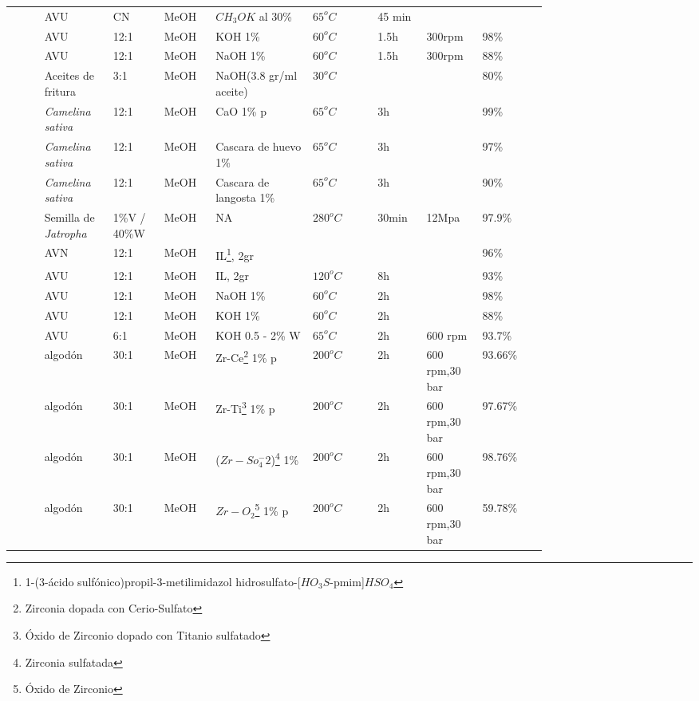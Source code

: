 \begin{longtable}{p{0.05\linewidth}  p{0.1\linewidth} p{0.07\linewidth}  p{0.07\linewidth} p{0.15\linewidth}  p{0.1\linewidth} p{0.07\linewidth}  p{0.07\linewidth} p{0.1\linewidth}}
	\cite{Caballero2012} &  AVU &  CN & MeOH&  $CH_3OK$ al 30\% &  $65^oC$ &45 min&   & \\
	\cite{CARO-BECERRAJuanLuisCASTELLANOS-RANGELLibierROMERO-GONZALEZFernandoRUIZ-MORALES2017} & AVU & 12:1 & MeOH & KOH 1\% &  $60^oC$ & 1.5h & 300rpm & 98\% \\
	\cite{CARO-BECERRAJuanLuisCASTELLANOS-RANGELLibierROMERO-GONZALEZFernandoRUIZ-MORALES2017} & AVU & 12:1 & MeOH & NaOH 1\% & $60^oC$ & 1.5h & 300rpm & 88\% \\
	\cite{Garcia-Diaz2013} & Aceites de fritura & 3:1 &  MeOH &  NaOH(3.8 gr/ml aceite) & $30^oC$ & & &   80\% \\
	\cite{Hangun-Balkir2016}& \emph{Camelina sativa} & 12:1 & MeOH & CaO 1\% p & $65^oC$ & 3h & & 99\% \\
	\cite{Hangun-Balkir2016}& \emph{Camelina sativa}&  12:1 & MeOH & Cascara de huevo 1\% &  $65^oC$ & 3h & & 97\% \\
	\cite{Hangun-Balkir2016}& \emph{Camelina sativa}&  12:1 & MeOH & Cascara de langosta 1\% & $65^oC$ & 3h & & 90\% \\
	\cite{Ishak2017}& Semilla de \emph{Jatropha} & 1\%V / 40\%W & MeOH & NA & $280^oC$ & 30min & 12Mpa & 97.9\% \\
	\cite{Liu2013}& AVN & 12:1 & MeOH & IL\footnote{1-(3-ácido sulfónico)propil-3-metilimidazol hidrosulfato-[$HO_3S$-pmim]$HSO_4$}, 2gr & &  & & 96\% \\
	\cite{Liu2013} & AVU & 12:1 & MeOH & IL, 2gr & $120^oC$ & 8h & &  93\% \\
	\cite{Lopez2015} & AVU & 12:1 & MeOH & NaOH 1\% & $60^oC$ & 2h & & 98\% \\
	\cite{Lopez2015}& AVU & 12:1 & MeOH & KOH 1\% & $60^oC$ & 2h & & 88\% \\
	\cite{Lugo2014}& AVU & 6:1 & MeOH & KOH 0.5 - 2\% W & $65^oC$ & 2h & 600 rpm & 93.7\% \\
	\cite{Morales2012}& algodón &  30:1 & MeOH & Zr-Ce\footnote{Zirconia dopada con Cerio-Sulfato} 1\% p & $200^oC$ & 2h & 600 rpm,30 bar & 93.66\% \\
	\cite{Morales2012}& algodón & 30:1 & MeOH & Zr-Ti\footnote{Óxido de Zirconio dopado con Titanio sulfatado} 1\% p & $200^oC$ & 2h & 600 rpm,30 bar & 97.67\% \\
	\cite{Morales2012}& algodón & 30:1 & MeOH &($Zr-So_4^-2$)\footnote{Zirconia sulfatada} 1\%  & $200^oC$ & 2h & 600 rpm,30 bar &  98.76\% \\
	\cite{Morales2012} & algodón & 30:1 & MeOH & $Zr-O_2$\footnote{Óxido de Zirconio} 1\% p & $200^oC$ & 2h & 600 rpm,30 bar &  59.78\% \\

\end{longtable}
